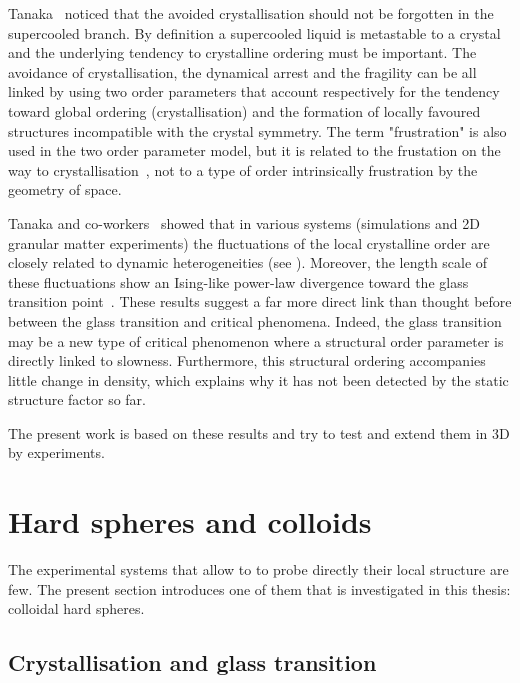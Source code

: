 Tanaka~\cite{tanaka1999top,Tanaka1999} noticed that the avoided crystallisation should not be forgotten in the supercooled branch. By definition a supercooled liquid is metastable to a crystal and the underlying tendency to crystalline ordering must be important. The avoidance of crystallisation, the dynamical arrest and the fragility can be all linked by using two order parameters that account respectively for the tendency toward global ordering (crystallisation) and the formation of locally favoured structures incompatible with the crystal symmetry. The term "frustration" is also used in the two order parameter model, but it is related to the frustation on the way to crystallisation~\citep{tanaka2005top, Tanaka20053371, Tanaka20053385, Shintani2006}, not to a type of order intrinsically frustration by the geometry of space.

Tanaka and co-workers~\citep{kawasaki2007cbd, Shintani2006, watanabe2008, Kawasaki2010} showed that in various systems (simulations and 2D granular matter experiments) the fluctuations of the local crystalline order are closely related to dynamic heterogeneities (see ). Moreover, the length scale of these fluctuations show an Ising-like power-law divergence toward the glass transition point~\citep{tanaka2010critical}. These results suggest a far more direct link than thought before between the glass transition and critical phenomena. Indeed, the glass transition may be a new type of critical phenomenon where a structural order parameter is directly linked to slowness. Furthermore, this structural ordering accompanies little change in density, which explains why it has not been detected by the static structure factor so far.

The present work is based on these results and try to test and extend them in 3D by experiments.


\section{Hard spheres and colloids}
\label{sec:HS-colloids}

The experimental systems that allow to to probe directly their local structure are few. The present section introduces one of them that is investigated in this thesis: colloidal hard spheres.

\subsection{Crystallisation and glass transition}

